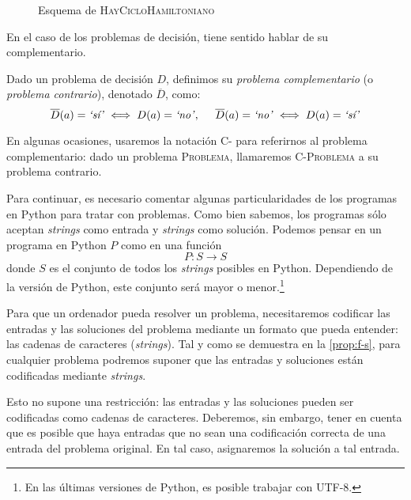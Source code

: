 \begin{figure}[H]
\centering
\vspace*{8pt}

\caption{Esquema de \textsc{HayCicloHamiltoniano}}
\label{fig:esquema-hayciclohamiltoniano}
\end{figure}
En el caso de los problemas de decisión, tiene sentido hablar de su complementario.

\begin{definicion}\label{def:problema-complementario}
Dado un problema de decisión $D$, definimos su \emph{problema complementario} (o \emph{problema contrario}), denotado $\overline{D}$, como:
$$
    \overline{D}(a) = \text{\emph{`sí'}} \iff D(a) = \text{\emph{`no'}},\;\;\;\;\;\overline{D}(a) = \text{\emph{`no'}} \iff D(a) = \text{\emph{`sí'}}
$$
\end{definicion}

En algunas ocasiones, usaremos la notación C- para referirnos al problema complementario: dado un problema \textsc{Problema}, llamaremos \textsc{C-Problema} a su problema contrario.

\vspace{8pt}

Para continuar, es necesario comentar algunas particularidades de los programas en Python para tratar con problemas. Como bien sabemos, los programas sólo aceptan \emph{strings} como entrada y \emph{strings} como solución. Podemos pensar en un programa en Python $P$ como en una función
$$
    P : S \longrightarrow S
$$
donde $S$ es el conjunto de todos los \emph{strings} posibles en Python. Dependiendo de la versión de Python, este conjunto será mayor o menor.\footnote{En las últimas versiones de Python, es posible trabajar con UTF-8.}

Para que un ordenador pueda resolver un problema, necesitaremos codificar las entradas y las soluciones del problema mediante un formato que pueda entender: las cadenas de caracteres (\emph{strings}). Tal y como se demuestra en la \cref{prop:f-s}, para cualquier problema podremos suponer que las entradas y soluciones están codificadas mediante \emph{strings}.

Esto no supone una restricción: las entradas y las soluciones pueden ser codificadas como cadenas de caracteres. Deberemos, sin embargo, tener en cuenta que es posible que haya entradas que no sean una codificación correcta de una entrada del problema original. En tal caso, asignaremos la solución  a tal entrada.

